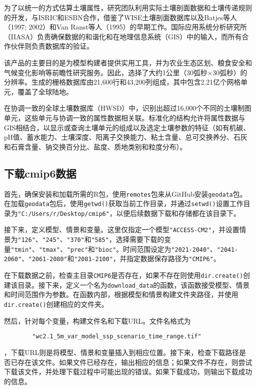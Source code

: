 \documentclass[AutoFakeBold]{LZUThesis-PgD&PhD}
\begin{document}
        为了以统一的方式估算土壤属性，研究团队利用实际土壤剖面数据和土壤传递规则的开发，与ISRIC和ESBN合作，借鉴了WISE土壤剖面数据库以及Batjes等人（1997; 2002）和Van Ranst等人（1995）的早期工作。国际应用系统分析研究所（IIASA）负责确保数据的和谐化和在地理信息系统（GIS）中的输入，而所有合作伙伴则负责数据库的验证。
        
        该产品的主要目的是为模型构建者提供实用工具，并为农业生态区划、粮食安全和气候变化影响等前瞻性研究服务。因此，选择了大约1公里（30弧秒×30弧秒）的分辨率。生成的栅格数据库由21,600行和43,200列组成，其中包含2.21亿个网格单元，覆盖了全球陆地。
        
        在协调一致的全球土壤数据库（HWSD）中，识别出超过16,000个不同的土壤制图单元，这些单元与协调一致的属性数据相关联。标准化的结构允许将属性数据与GIS相结合，以显示或查询土壤单元的组成以及选定土壤参数的特征（如有机碳、pH值、蓄水能力、土壤深度、阳离子交换能力、粘土含量、总可交换养分、石灰和石膏含量、钠交换百分比、盐度、质地类别和粒度分布）。
            
    \subsection{下载cmip6数据}
    首先，确保安装和加载所需的R包，使用\texttt{remotes}包来从GitHub安装\texttt{geodata}包。在加载\texttt{geodata}包后，使用\texttt{getwd()}获取当前工作目录，并通过\texttt{setwd()}设置工作目录为\texttt{"C:/Users/r/Desktop/cmip6"}，以便后续数据下载和存储都在该目录下。
    
    接下来，定义模型、情景和变量。这里仅指定一个模型\texttt{"ACCESS-CM2"}，并设置情景为\texttt{"126"}、\texttt{"245"}、\texttt{"370"}和\texttt{"585"}，选择需要下载的变量\texttt{"tmin"}、\texttt{"tmax"}、\texttt{"prec"}和\texttt{"bioc"}。时间范围设定为\texttt{"2021-2040"}、\texttt{"2041-2060"}、\texttt{"2061-2080"}和\texttt{"2081-2100"}，并指定数据保存路径为\texttt{"CMIP6"}。
    
    在下载数据之前，检查主目录\texttt{CMIP6}是否存在，如果不存在则使用\texttt{dir.create()}创建该目录。接下来，定义一个名为\texttt{download\_data}的函数，该函数接受模型、情景和时间范围作为参数。在函数内部，根据模型和情景构建文件夹路径，并使用\texttt{dir.create()}创建相应的文件夹。
    
    然后，针对每个变量，构建文件名和下载URL。文件名格式为
    \begin{lstlisting}
    	"wc2.1_5m_var_model_ssp_scenario_time_range.tif"
    \end{lstlisting}
    ，下载URL则是将模型、情景和变量插入到相应位置。接下来，检查下载路径是否已存在该文件。如果文件已经存在，输出相应的信息；如果文件不存在，则尝试下载该文件，并处理下载过程中可能出现的错误。如果下载成功，则输出下载成功的信息。
    
\end{document}
